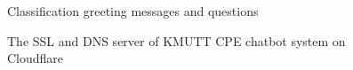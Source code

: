 \documentclass[12pt,oneside,openright,a4paper]{cpe-english-project}
\begin{document}
\begin{figure}[!h]\centering
{}
\caption{Classification greeting messages and questions}\label{fig:Classification greeting messages and questions}
\end{figure}
\begin{figure}[!h]\centering
{}
\caption{The SSL and DNS server of KMUTT CPE chatbot system on Cloudflare}\label{fig:The SSL and DNS server of KMOTT CPE chatbot system on Cloudflare}
\end{figure}
\end{document}
